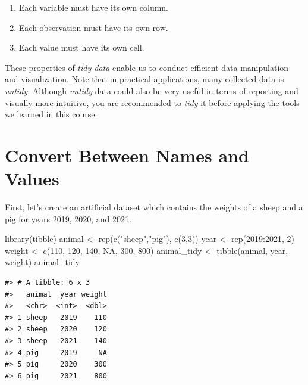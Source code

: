 \documentclass[
]{book}
\newenvironment{Shaded}{\begin{snugshade}}{\end{snugshade}}
\newcommand{\ConstantTok}[1]{\textcolor[rgb]{0.00,0.00,0.00}{#1}}
\newcommand{\DecValTok}[1]{\textcolor[rgb]{0.00,0.00,0.81}{#1}}
\newcommand{\FunctionTok}[1]{\textcolor[rgb]{0.00,0.00,0.00}{#1}}
\newcommand{\NormalTok}[1]{#1}
\newcommand{\OtherTok}[1]{\textcolor[rgb]{0.56,0.35,0.01}{#1}}
\newcommand{\SpecialCharTok}[1]{\textcolor[rgb]{0.00,0.00,0.00}{#1}}
\newcommand{\StringTok}[1]{\textcolor[rgb]{0.31,0.60,0.02}{#1}}
\providecommand{\tightlist}{%
  \setlength{\itemsep}{0pt}\setlength{\parskip}{0pt}}
\begin{document}
\begin{enumerate}
\def\labelenumi{\arabic{enumi}.}
\tightlist
\item
  Each variable must have its own column.
\item
  Each observation must have its own row.
\item
  Each value must have its own cell.
\end{enumerate}

These properties of \emph{tidy data} enable us to conduct efficient data manipulation and visualization. Note that in practical applications, many collected data is \emph{untidy}. Although \emph{untidy} data could also be very useful in terms of reporting and visually more intuitive, you are recommended to \emph{tidy} it before applying the tools we learned in this course.

\hypertarget{tidy-name-value}{%
\section{Convert Between Names and Values}\label{tidy-name-value}}

First, let's create an artificial dataset which contains the weights of a sheep and a pig for years 2019, 2020, and 2021.

\begin{Shaded}
\begin{Highlighting}[]
\FunctionTok{library}\NormalTok{(tibble)}
\NormalTok{animal }\OtherTok{\textless{}{-}} \FunctionTok{rep}\NormalTok{(}\FunctionTok{c}\NormalTok{(}\StringTok{"sheep"}\NormalTok{,}\StringTok{"pig"}\NormalTok{), }\FunctionTok{c}\NormalTok{(}\DecValTok{3}\NormalTok{,}\DecValTok{3}\NormalTok{))}
\NormalTok{year }\OtherTok{\textless{}{-}} \FunctionTok{rep}\NormalTok{(}\DecValTok{2019}\SpecialCharTok{:}\DecValTok{2021}\NormalTok{, }\DecValTok{2}\NormalTok{)}
\NormalTok{weight }\OtherTok{\textless{}{-}} \FunctionTok{c}\NormalTok{(}\DecValTok{110}\NormalTok{, }\DecValTok{120}\NormalTok{, }\DecValTok{140}\NormalTok{, }\ConstantTok{NA}\NormalTok{, }\DecValTok{300}\NormalTok{, }\DecValTok{800}\NormalTok{)}
\NormalTok{animal\_tidy }\OtherTok{\textless{}{-}} \FunctionTok{tibble}\NormalTok{(animal, year, weight)}
\NormalTok{animal\_tidy}
\end{Highlighting}
\end{Shaded}

\begin{verbatim}
#> # A tibble: 6 x 3
#>   animal  year weight
#>   <chr>  <int>  <dbl>
#> 1 sheep   2019    110
#> 2 sheep   2020    120
#> 3 sheep   2021    140
#> 4 pig     2019     NA
#> 5 pig     2020    300
#> 6 pig     2021    800
\end{verbatim}
\end{document}
